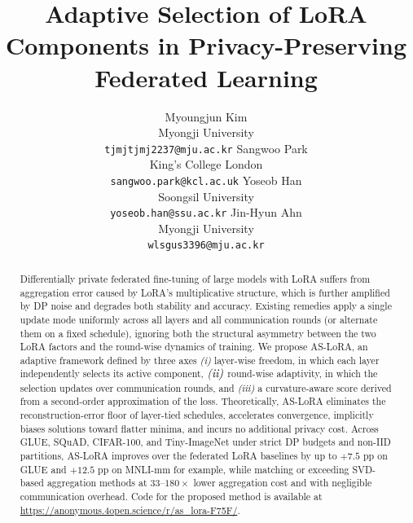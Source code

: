 \documentclass{article}
\title{Adaptive Selection of LoRA Components in Privacy-Preserving Federated Learning}
\author{
    Myoungjun Kim \\
    Myongji University\\
    \texttt{tjmjtjmj2237@mju.ac.kr}
    \And
    Sangwoo Park\\
    King's College London\\
    \texttt{sangwoo.park@kcl.ac.uk}
    \And
    Yoseob Han \\
    Soongsil University\\
    \texttt{yoseob.han@ssu.ac.kr}
    \And
    Jin-Hyun Ahn \\
    Myongji University\\
    \texttt{wlsgus3396@mju.ac.kr}\\
}
\begin{document}
\maketitle

\begin{abstract}
Differentially private federated fine-tuning of large models with LoRA suffers from aggregation error caused by LoRA's multiplicative structure, which is further amplified by DP noise and degrades both stability and accuracy. Existing remedies apply a single update mode uniformly across all layers and all communication rounds (or alternate them on a fixed schedule), ignoring both the structural asymmetry between the two LoRA factors and the round-wise dynamics of training. We propose AS-LoRA, an adaptive framework defined by three axes \emph{(i)} layer-wise freedom, in which each layer independently selects its active component, $\emph{(ii)}$ round-wise adaptivity, in which the selection updates over communication rounds, and \emph{(iii)} a curvature-aware score derived from a second-order approximation of the loss. Theoretically, AS-LoRA eliminates the reconstruction-error floor of layer-tied schedules, accelerates convergence, implicitly biases solutions toward flatter minima, and incurs no additional privacy cost. Across GLUE, SQuAD, CIFAR-100, and Tiny-ImageNet under strict DP budgets and non-IID partitions, AS-LoRA improves over the federated LoRA baselines by up to $+7.5$ pp on GLUE and $+12.5$ pp on MNLI-mm for example, while matching or exceeding SVD-based aggregation methods at $33\text{--}180 \times$ lower aggregation cost and with negligible communication overhead. Code for the proposed method is available at \url{https://anonymous.4open.science/r/as_lora-F75F/}.
\end{abstract}






% 





  
  

\end{document}
